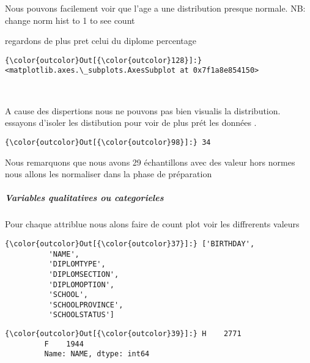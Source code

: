\documentclass[11pt]{article}
\begin{document}
    Nous pouvons facilement voir que l'age a une distribution presque
normale. NB: change norm hist to 1 to see count

    regardons de plus pret celui du diplome percentage

            \begin{Verbatim}[commandchars=\\\{\}]
{\color{outcolor}Out[{\color{outcolor}128}]:} <matplotlib.axes.\_subplots.AxesSubplot at 0x7f1a8e854150>
\end{Verbatim}
        
    \begin{center}
    \end{center}
    { \hspace*{\fill} \\}
    
    A cause des dispertions nous ne pouvons pas bien visualis la
distribution. essayons d'isoler les distibution pour voir de plus prét
les données .

            \begin{Verbatim}[commandchars=\\\{\}]
{\color{outcolor}Out[{\color{outcolor}98}]:} 34
\end{Verbatim}
        
    Nous remarquons que nous avons 29 échantillons avec des valeur hors
normes nous allons les normaliser dans la phase de préparation

    \subparagraph{Variables qualitatives ou
categorieles}\label{variables-qualitatives-ou-categorieles}

    Pour chaque attriblue nous alons faire de count plot voir les
diffrerents valeurs

            \begin{Verbatim}[commandchars=\\\{\}]
{\color{outcolor}Out[{\color{outcolor}37}]:} ['BIRTHDAY',
          'NAME',
          'DIPLOMTYPE',
          'DIPLOMSECTION',
          'DIPLOMOPTION',
          'SCHOOL',
          'SCHOOLPROVINCE',
          'SCHOOLSTATUS']
\end{Verbatim}
        
            \begin{Verbatim}[commandchars=\\\{\}]
{\color{outcolor}Out[{\color{outcolor}39}]:} H    2771
         F    1944
         Name: NAME, dtype: int64
\end{Verbatim}
        
\end{document}
